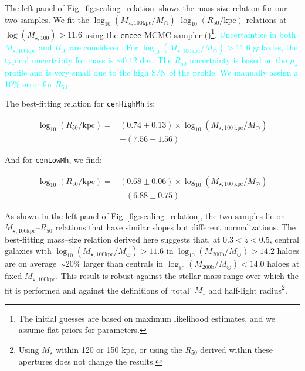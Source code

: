 \documentclass[a4paper,fleqn,usenatbib]{mnras}
\def\rbcg{\texttt{cenHighMh}}
\def\nbcg{\texttt{cenLowMh}}
\def\mstar{{$M_{\star}$}}
\def\logmhalo{{$\log_{10} (M_{\mathrm{200b}}/M_{\odot})$}}
\def\mtot{{$M_{\star,100\mathrm{kpc}}$}}
\def\logmtot{{$\log_{10} (M_{\star,100\mathrm{kpc}}/M_{\odot})$}}
\def\s2n{{$\mathrm{S}/\mathrm{N}$}}
\def\mden{{$\mu_{\star}$}}
\newcommand{\song}[1]{\textcolor{cyan}{#1}}
\begin{document}
    The left panel of Fig~\ref{fig:scaling_relation} shows the mass-size relation for our two samples. We fit the \logmtot{}-$\log_{10} (R_{\mathrm{50}}/\mathrm{kpc})$ relations at 
    $\log(M_{\star,100})>11.6$ using the \texttt{emcee} MCMC sampler 
    (\citealt{Emcee})\footnote{The initial guesses are based on maximum 
    likelihood estimates, and we assume flat priors for parameters.}.
    \song{
    Uncertainties in both \mtot{} and $R_{\mathrm{50}}$ are considered. 
    For \logmtot{}$>11.6$ galaxies, the typical uncertainty for mass is $\sim 0.12$
    dex.  
    The $R_{\mathrm{50}}$ uncertainty is based on the \mden{} profile and
    is very small due to the high \s2n{} of the profile. 
    We manually assign a 10\% error for $R_{\mathrm{50}}$. 
    }
    
    The best-fitting relation for \rbcg{} is:
    
    \begin{equation}
        \begin{aligned}
        \log_{10} (R_{\mathrm{50}}/\mathrm{kpc}) = & (0.74\pm0.13) \times \log_{10} (M_{\star, 100\ \mathrm{kpc}}/M_{\odot}) \\ & -(7.56\pm1.56)
        \end{aligned}
    \end{equation}

    \noindent And for \nbcg{}, we find:
    
    \begin{equation}
        \begin{aligned}
        \log_{10} (R_{\mathrm{50}}/\mathrm{kpc}) = & (0.68\pm0.06) \times \log_{10} (M_{\star, 100\ \mathrm{kpc}}/M_{\odot}) \\ & -(6.88\pm0.75)
        \end{aligned}
    \end{equation}
    
    \noindent As shown in the left panel of Fig~\ref{fig:scaling_relation}, the two samples lie on 
    \mtot{}--$R_{\mathrm{50}}$ relations that have similar slopes but 
    different normalizations. The best-fitting mass--size relation derived here suggests that, 
    at $0.3 < z < 0.5$, central galaxies with \logmtot{}$>11.6$ in \logmhalo{}$>14.2$
    haloes are on average $\sim20$\% larger than centrals in \logmhalo{}$<14.0$
    haloes at fixed \mtot{}.
    This result is robust against the stellar mass range over which the fit is 
    performed and against the definitions of  `total' \mstar{} and half-light 
    radius\footnote{Using \mstar{} within 120 or 150 kpc, or using the 
    $R_{\mathrm{50}}$ derived within these apertures does not change the results.}. 
    
\end{document}
